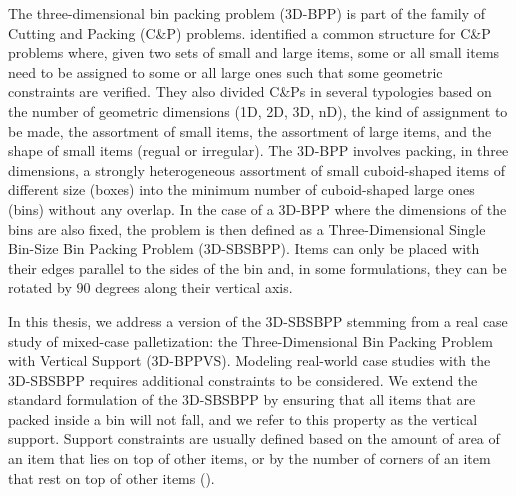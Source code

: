 The three-dimensional bin packing problem (3D-BPP) is part of the family of Cutting and Packing (C\&P) problems.
\cite{WASCHER20071109} identified a common structure for C\&P problems where, given two sets of small and large items, some or all small items need to be assigned to some or all large ones such that some geometric constraints are verified.
They also divided C\&Ps in several typologies based on the number of geometric dimensions (1D, 2D, 3D, nD), the kind of assignment to be made, the assortment of small items, the assortment of large items, and the shape of small items (regual or irregular).
The 3D-BPP involves packing, in three dimensions, a strongly heterogeneous assortment of small cuboid-shaped items of different size (boxes) into the minimum number of cuboid-shaped large ones (bins) without any overlap.
In the case of a 3D-BPP where the dimensions of the bins are also fixed, the problem is then defined as a Three-Dimensional Single Bin-Size Bin Packing Problem (3D-SBSBPP).
Items can only be placed with their edges parallel to the sides of the bin and, in some formulations, they can be rotated by $90$ degrees along their vertical axis.

In this thesis, we address a version of the 3D-SBSBPP stemming from a real case study of mixed-case palletization: the Three-Dimensional Bin Packing Problem with Vertical Support (3D-BPPVS).
Modeling real-world case studies with the 3D-SBSBPP requires additional constraints to be considered. We extend the standard formulation of the 3D-SBSBPP by ensuring that all items that are packed inside a bin will not fall, and we refer to this property as the vertical support.
Support constraints are usually defined based on the amount of area of an item that lies on top of other items, or by the number of corners of an item that rest on top of other items (\cite{GZARA20201062, paquay2016mixed, kurpel2020exact}).

